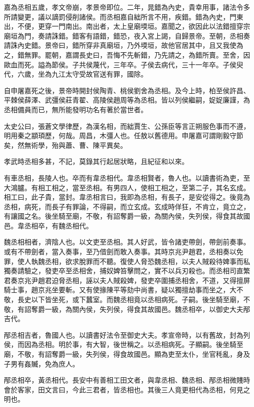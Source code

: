 嘉為丞相五歲，孝文帝崩，孝景帝即位。二年，晁錯為內史，貴幸用事，諸法令多所請變更，議以謫罰侵削諸侯。而丞相嘉自絀所言不用，疾錯。錯為內史，門東出，不便，更穿一門南出。南出者，太上皇廟堧垣。嘉聞之，欲因此以法錯擅穿宗廟垣為門，奏請誅錯。錯客有語錯，錯恐，夜入宮上謁，自歸景帝。至朝，丞相奏請誅內史錯。景帝曰，錯所穿非真廟垣，乃外堧垣，故他官居其中，且又我使為之，錯無罪。罷朝，嘉謂長史曰，吾悔不先斬錯，乃先請之，為錯所賣。至舍，因歐血而死。謚為節侯。子共侯蔑代，三年卒。子侯去病代，三十一年卒。子侯臾代，六歲，坐為九江太守受故官送有罪，國除。

自申屠嘉死之後，景帝時開封侯陶青、桃侯劉舍為丞相。及今上時，柏至侯許昌、平棘侯薛澤、武彊侯莊青翟、高陵侯趙周等為丞相。皆以列侯繼嗣，娖娖廉謹，為丞相備員而已，無所能發明功名有著於當世者。

太史公曰，張蒼文學律歷，為漢名相，而絀賈生、公孫臣等言正朔服色事而不遵，明用秦之顓頊歷，何哉。周昌，木彊人也。任敖以舊德用。申屠嘉可謂剛毅守節矣，然無術學，殆與蕭、曹、陳平異矣。

孝武時丞相多甚，不記，莫錄其行起居狀略，且紀征和以來。

有車丞相，長陵人也。卒而有韋丞相代。韋丞相賢者，魯人也。以讀書術為吏，至大鴻臚。有相工相之，當至丞相。有男四人，使相工相之，至第二子，其名玄成。相工曰，此子貴，當封。韋丞相言曰，我即為丞相，有長子，是安從得之。後竟為丞相，病死，而長子有罪論，不得嗣，而立玄成。玄成時佯狂，不肯立，竟立之，有讓國之名。後坐騎至廟，不敬，有詔奪爵一級，為關內侯，失列侯，得食其故國邑。韋丞相卒，有魏丞相代。

魏丞相相者，濟陰人也。以文吏至丞相。其人好武，皆令諸吏帶劍，帶劍前奏事。或有不帶劍者，當入奏事，至乃借劍而敢入奏事。其時京兆尹趙君，丞相奏以免罪，使人執魏丞相，欲求脫罪而不聽。復使人脅恐魏丞相，以夫人賊殺待婢事而私獨奏請驗之，發吏卒至丞相舍，捕奴婢笞擊問之，實不以兵刃殺也。而丞相司直繁君奏京兆尹趙君迫脅丞相，誣以夫人賊殺婢，發吏卒圍捕丞相舍，不道，又得擅屏騎士事，趙京兆坐要斬。又有使掾陳平等劾中尚書，疑以獨擅劫事而坐之，大不敬，長史以下皆坐死，或下蠶室。而魏丞相竟以丞相病死。子嗣。後坐騎至廟，不敬，有詔奪爵一級，為關內侯，失列侯，得食其故國邑。魏丞相卒，以御史大夫邴吉代。

邴丞相吉者，魯國人也。以讀書好法令至御史大夫。孝宣帝時，以有舊故，封為列侯，而因為丞相。明於事，有大智，後世稱之。以丞相病死。子顯嗣。後坐騎至廟，不敬，有詔奪爵一級，失列侯，得食故國邑。顯為吏至太仆，坐官秏亂，身及子男有姦贓，免為庶人。

邴丞相卒，黃丞相代。長安中有善相工田文者，與韋丞相、魏丞相、邴丞相微賤時會於客家，田文言曰，今此三君者，皆丞相也。其後三人竟更相代為丞相，何見之明也。


